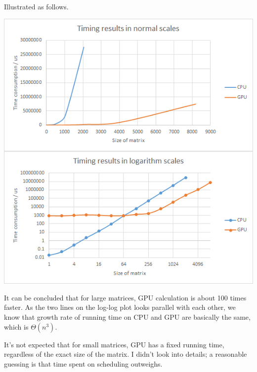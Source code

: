 \begin{homeworkProblem}
Illustrated as follows.

\includegraphics[width=.75\columnwidth]{matrix}

It can be concluded that for large matrices, GPU calculation is about 100 times faster. As the two lines on the log-log plot looks parallel with each other, we know that growth rate of running time on CPU and GPU are basically the same, which is $\Theta(n^3)$.

It's not expected that for small matrices, GPU has a fixed running time, regardless of the exact size of the matrix. I didn't look into details; a reasonable guessing is that time spent on scheduling outweighs.

\end{homeworkProblem}



